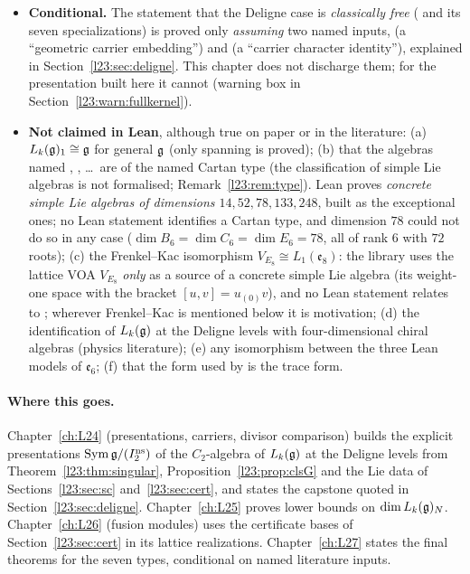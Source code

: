 \begin{itemize}
  Section~\ref{l23:sec:sc}), and for $\mathfrak g_2,\mathfrak f_4,\mathfrak e_6$ the longness of the chosen root is itself not checked in
  Lean. For $\mathfrak{sl}_n$ it is not established in Lean at all.
\item \textbf{Conditional.} The statement that the Deligne case is \emph{classically free}
  ( and its seven specializations) is proved only \emph{assuming} two named inputs,
   (a ``geometric carrier embedding'') and  (a ``carrier character identity''), explained in
  Section~\ref{l23:sec:deligne}. This chapter does not discharge them; for the presentation built here it cannot
  (warning box in Section~\ref{l23:warn:fullkernel}).
\item \textbf{Not claimed in Lean}, although true on paper or in the literature:
  (a) $L_k(\mathfrak g)_1\cong\mathfrak g$ for general $\mathfrak g$ (only spanning is proved);
  (b) that the algebras named , , \dots\ are of the named Cartan type (the classification of simple
  Lie algebras is not formalised; Remark~\ref{l23:rem:type}). Lean proves \emph{concrete simple Lie algebras of dimensions
  $14,52,78,133,248$}, built as the exceptional ones; no Lean statement identifies a Cartan type, and dimension $78$ could not do so
  in any case ($\dim B_6=\dim C_6=\dim E_6=78$, all of rank $6$ with $72$ roots);
  (c) the Frenkel--Kac isomorphism $V_{E_8}\cong L_1(\mathfrak e_8)$: the library uses the lattice VOA $V_{E_8}$ \emph{only} as a
  source of a concrete simple Lie algebra (its weight-one space with the bracket $[u,v]=u_{(0)}v$), and no Lean statement
  relates  to ; wherever Frenkel--Kac is mentioned below it is motivation;
  (d) the identification of $L_k(\mathfrak g)$ at the Deligne levels with four-dimensional chiral algebras (physics literature);
  (e) any isomorphism between the three Lean models of $\mathfrak e_6$;
  (f) that the form used by  is the trace form.
\end{itemize}

\paragraph{Where this goes.}
Chapter~\ref{ch:L24} (presentations, carriers, divisor comparison) builds the explicit presentations
$\mathrm{Sym}\,\mathfrak g/(I_2^{\mathrm{ns}})$ of the $C_2$-algebra of $L_k(\mathfrak g)$ at the Deligne levels from
Theorem~\ref{l23:thm:singular}, Proposition~\ref{l23:prop:clsG} and the Lie data of Sections~\ref{l23:sec:sc}
and~\ref{l23:sec:cert}, and states the capstone quoted in Section~\ref{l23:sec:deligne}. Chapter~\ref{ch:L25} proves lower
bounds on $\dim L_k(\mathfrak g)_N$. Chapter~\ref{ch:L26} (fusion modules) uses the certificate bases of
Section~\ref{l23:sec:cert} in its lattice realizations. Chapter~\ref{ch:L27} states the final theorems for the seven types,
conditional on named literature inputs.

